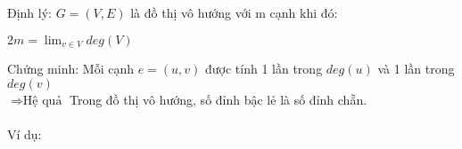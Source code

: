 \documentclass[12pt,oneside]{book}
\begin{document}
Định lý: $G=(V,E)$ là đồ thị vô hướng với m cạnh khi đó:
\begin{center}
$\boxed{2m = \displaystyle\lim_{v\in V} deg(V)}$
\end{center}
Chứng minh: Mỗi cạnh $e = (u,v)$ được tính 1 lần trong $deg(u)$ và 1 lần trong $deg(v)$
\\$\Rightarrow \boxed{\text{Hệ quả}}$ Trong đồ thị vô hướng, số đỉnh bậc lẻ là số đỉnh chẵn.
\\\\ Ví dụ:
\begin{center}



\begin{tikzpicture}[x=0.75pt,y=0.75pt,yscale=-1,xscale=1]


\end{tikzpicture}
\end{center}
\end{document}
